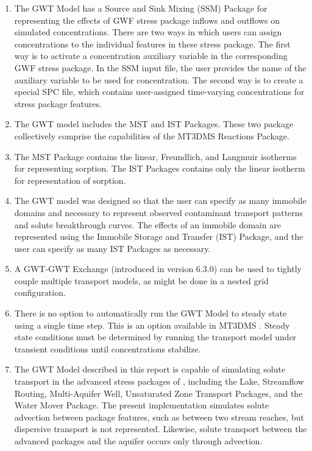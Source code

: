 \begin{enumerate}
\item The GWT Model has a Source and Sink Mixing (SSM) Package for representing the effects of GWF stress package inflows and outflows on simulated concentrations.  There are two ways in which users can assign concentrations to the individual features in these stress package.  The first way is to activate a concentration auxiliary variable in the corresponding GWF stress package.  In the SSM input file, the user provides the name of the auxiliary variable to be used for concentration.  The second way is to create a special SPC file, which contains user-assigned time-varying concentrations for stress package features.

\item The GWT model includes the MST and IST Packages.  These two package collectively comprise the capabilities of the MT3DMS Reactions Package.

\item The MST Package contains the linear, Freundlich, and Langmuir isotherms for representing sorption.  The IST Packages contains only the linear isotherm for representation of sorption. 

\item The GWT model was designed so that the user can specify as many immobile domains and necessary to represent observed contaminant transport patterns and solute breakthrough curves.  The effects of an immobile domain are represented using the Immobile Storage and Transfer (IST) Package, and the user can specify as many IST Packages as necessary.  

\item A GWT-GWT Exchange (introduced in version 6.3.0) can be used to tightly couple multiple transport models, as might be done in a nested grid configuration.  

\item There is no option to automatically run the GWT Model to steady state using a single time step.  This is an option available in MT3DMS \citep{zheng2010supplemental}.  Steady state conditions must be determined by running the transport model under transient conditions until concentrations stabilize.

\item The GWT Model described in this report is capable of simulating solute transport in the advanced stress packages of \mf, including the Lake, Streamflow Routing, Multi-Aquifer Well, Unsaturated Zone Transport Packages, and the Water Mover Package.  The present implementation simulates solute advection between package features, such as between two stream reaches, but dispersive transport is not represented.  Likewise, solute transport between the advanced packages and the aquifer occurs only through advection.


\end{enumerate}
